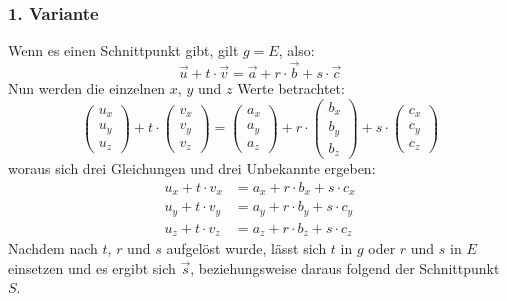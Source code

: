 \documentclass[a4paper,12pt]{article}
\begin{document}
\subsubsection*{1. Variante}
Wenn es einen Schnittpunkt gibt, gilt $g = E$, also:
$$\vec{u} + t \cdot \vec{v} = \vec{a} + r \cdot \vec{b} + s \cdot \vec{c}$$
Nun werden die einzelnen $x$, $y$ und $z$ Werte betrachtet:
$$\begin{pmatrix}u_x\\u_y\\u_z\end{pmatrix} + t \cdot \begin{pmatrix}v_x\\v_y\\v_z\end{pmatrix} = \begin{pmatrix}a_x\\a_y\\a_z\end{pmatrix} + r \cdot \begin{pmatrix}b_x\\b_y\\b_z\end{pmatrix} + s \cdot \begin{pmatrix}c_x\\c_y\\c_z\end{pmatrix}$$
woraus sich drei Gleichungen und drei Unbekannte ergeben:
\begin{equation}
\begin{split}
u_x + t \cdot v_x & = a_x + r \cdot b_x + s \cdot c_x\\ 
u_y + t \cdot v_y & = a_y + r \cdot b_y + s \cdot c_y\\ 
u_z + t \cdot v_z & = a_z + r \cdot b_z + s \cdot c_z
\end{split}
\end{equation}
Nachdem nach $t$, $r$ und $s$ aufgelöst wurde, lässt sich $t$ in $g$ oder $r$ und $s$ in $E$ einsetzen und es ergibt sich $\vec{s}$, beziehungsweise daraus folgend der
Schnittpunkt $S$.
\end{document}
